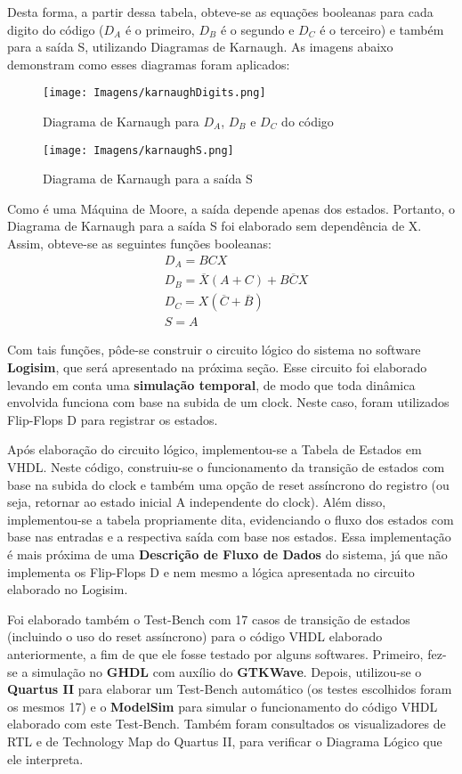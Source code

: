 \documentclass[12pt,a4paper]{article}
\begin{document}
Desta forma, a partir dessa tabela, obteve-se as equações booleanas para cada digito do código ($D_A$  é o primeiro, $D_B$ é o segundo e $D_C$ é o terceiro) e também para a saída S, utilizando Diagramas de Karnaugh. As imagens abaixo demonstram como esses diagramas foram aplicados:

\pagebreak

\begin{figure}[h]
	\centering
	\texttt{[image: Imagens/karnaughDigits.png]}
	\caption{Diagrama de Karnaugh para $D_A$, $D_B$ e $D_C$ do código}
\end{figure}

\begin{figure}[h]
	\centering
	\texttt{[image: Imagens/karnaughS.png]}
	\caption{Diagrama de Karnaugh para a saída S}
\end{figure}


Como é uma Máquina de Moore, a saída depende apenas dos estados. Portanto, o Diagrama de Karnaugh para a saída S foi elaborado sem dependência de X. Assim, obteve-se as seguintes funções booleanas:
\begin{align}
&D_A = BCX \\
&D_B = \overline X(A+C) + B\overline C X \\
&D_C = X(\overline C + \overline B) \\
&S = A
\end{align}

Com tais funções, pôde-se construir o circuito lógico do sistema no software \textbf{Logisim}, que será apresentado na próxima seção. Esse circuito foi elaborado levando em conta uma \textbf{simulação temporal}, de modo que toda dinâmica envolvida funciona com base na subida de um clock. Neste caso, foram utilizados Flip-Flops D para registrar os estados.

Após elaboração do circuito lógico, implementou-se a Tabela de Estados em VHDL. Neste código, construiu-se o funcionamento da transição de estados com base na subida do clock e também uma opção de reset assíncrono do registro (ou seja, retornar ao estado inicial A independente do clock). Além disso, implementou-se a tabela propriamente dita, evidenciando o fluxo dos estados com base nas entradas e a respectiva saída com base nos estados. Essa implementação é mais próxima de uma \textbf{Descrição de Fluxo de Dados} do sistema, já que não implementa os Flip-Flops D e nem mesmo a lógica apresentada no circuito elaborado no Logisim.

Foi elaborado também o Test-Bench com 17 casos de transição de estados (incluindo o uso do reset assíncrono) para o código VHDL elaborado anteriormente, a fim de que ele fosse testado por alguns softwares. Primeiro, fez-se a simulação no \textbf{GHDL} com auxílio do \textbf{GTKWave}. Depois, utilizou-se o \textbf{Quartus II} para elaborar um Test-Bench automático (os testes escolhidos foram os mesmos 17) e o \textbf{ModelSim} para simular o funcionamento do código VHDL elaborado com este Test-Bench. Também foram consultados os visualizadores de RTL e de Technology Map do Quartus II, para verificar o Diagrama Lógico que ele interpreta.
\end{document}
